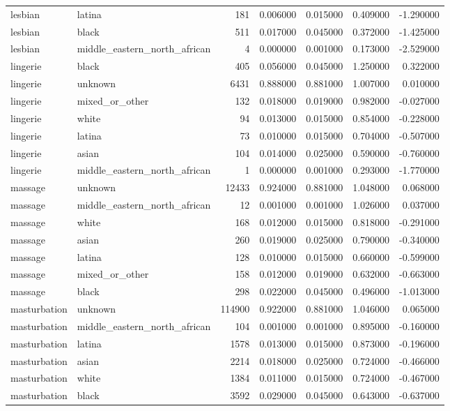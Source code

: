 \begin{tabular}{llrrrrr}
lesbian & latina & 181 & 0.006000 & 0.015000 & 0.409000 & -1.290000 \\
lesbian & black & 511 & 0.017000 & 0.045000 & 0.372000 & -1.425000 \\
lesbian & middle_eastern_north_african & 4 & 0.000000 & 0.001000 & 0.173000 & -2.529000 \\
lingerie & black & 405 & 0.056000 & 0.045000 & 1.250000 & 0.322000 \\
lingerie & unknown & 6431 & 0.888000 & 0.881000 & 1.007000 & 0.010000 \\
lingerie & mixed_or_other & 132 & 0.018000 & 0.019000 & 0.982000 & -0.027000 \\
lingerie & white & 94 & 0.013000 & 0.015000 & 0.854000 & -0.228000 \\
lingerie & latina & 73 & 0.010000 & 0.015000 & 0.704000 & -0.507000 \\
lingerie & asian & 104 & 0.014000 & 0.025000 & 0.590000 & -0.760000 \\
lingerie & middle_eastern_north_african & 1 & 0.000000 & 0.001000 & 0.293000 & -1.770000 \\
massage & unknown & 12433 & 0.924000 & 0.881000 & 1.048000 & 0.068000 \\
massage & middle_eastern_north_african & 12 & 0.001000 & 0.001000 & 1.026000 & 0.037000 \\
massage & white & 168 & 0.012000 & 0.015000 & 0.818000 & -0.291000 \\
massage & asian & 260 & 0.019000 & 0.025000 & 0.790000 & -0.340000 \\
massage & latina & 128 & 0.010000 & 0.015000 & 0.660000 & -0.599000 \\
massage & mixed_or_other & 158 & 0.012000 & 0.019000 & 0.632000 & -0.663000 \\
massage & black & 298 & 0.022000 & 0.045000 & 0.496000 & -1.013000 \\
masturbation & unknown & 114900 & 0.922000 & 0.881000 & 1.046000 & 0.065000 \\
masturbation & middle_eastern_north_african & 104 & 0.001000 & 0.001000 & 0.895000 & -0.160000 \\
masturbation & latina & 1578 & 0.013000 & 0.015000 & 0.873000 & -0.196000 \\
masturbation & asian & 2214 & 0.018000 & 0.025000 & 0.724000 & -0.466000 \\
masturbation & white & 1384 & 0.011000 & 0.015000 & 0.724000 & -0.467000 \\
masturbation & black & 3592 & 0.029000 & 0.045000 & 0.643000 & -0.637000 \\

\end{tabular}
